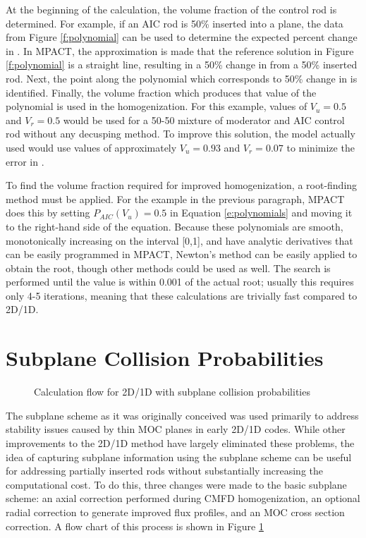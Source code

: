 At the beginning of the calculation, the volume fraction of the control rod is determined.  For example, if an AIC rod is 50\% inserted into a plane, the data from Figure \ref{f:polynomial} can be used to determine the expected percent change in \keff{}.  In MPACT, the approximation is made that the reference solution in Figure \ref{f:polynomial} is a straight line, resulting in a 50\% change in \keff{} from a 50\% inserted rod.  Next, the point along the polynomial which corresponds to 50\% change in \keff{} is identified.  Finally, the volume fraction which produces that value of the polynomial is used in the homogenization.  For this example, values of $V_u=0.5$ and $V_r=0.5$ would be used for a 50-50 mixture of moderator and AIC control rod without any decusping method.  To improve this solution, the model actually used would use values of approximately $V_u=0.93$ and $V_r=0.07$ to minimize the error in \keff{}.

To find the volume fraction required for improved homogenization, a root-finding method must be applied.  For the example in the previous paragraph, MPACT does this by setting $P_{AIC}\left(V_u\right) = 0.5$ in Equation \ref{e:polynomials} and moving it to the right-hand side of the equation.  Because these polynomials are smooth, monotonically increasing on the interval [0,1], and have analytic derivatives that can be easily programmed in MPACT, Newton's method \cite{2006friendlyIntroductionToNumericalAnalysis} can be easily applied to obtain the root, though other methods could be used as well.  The search is performed until the value is within 0.001 of the actual root; usually this requires only 4-5 iterations, meaning that these calculations are trivially fast compared to 2D/1D.

\section{Subplane Collision Probabilities}

\begin{figure}[h]
    \centering
    
    \caption{Calculation flow for 2D/1D with subplane collision probabilities}\label{f:SubplaneCP-flowchart}
\end{figure}

The subplane scheme as it was originally conceived was used primarily to address stability issues caused by thin MOC planes in early 2D/1D codes.  While other improvements to the 2D/1D method have largely eliminated these problems, the idea of capturing subplane information using the subplane scheme can be useful for addressing partially inserted rods without substantially increasing the computational cost.  To do this, three changes were made to the basic subplane scheme: an axial correction performed during CMFD homogenization, an optional radial correction to generate improved flux profiles, and an MOC cross section correction.  A flow chart of this process is shown in Figure \ref{f:SubplaneCP-flowchart}

